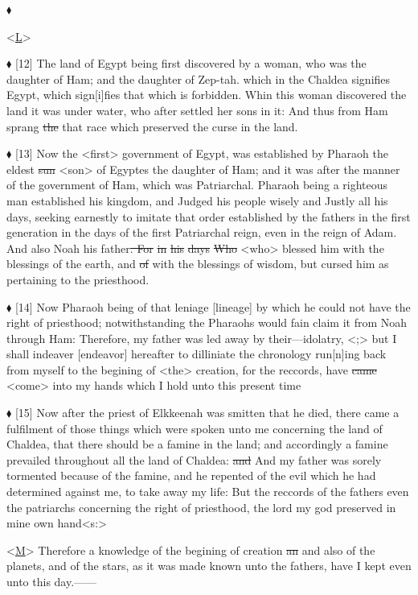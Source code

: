 				\begin{tightright}
				$\blacklozenge$

				<\uline{L}>
				\end{tightright}

				$\blacklozenge$ [12]	The land of Egypt being first discovered by a woman, who was the daughter of Ham; and the daughter of Zep-tah. which in the Chaldea signifies Egypt, which sign[i]fies that which is forbidden. Whin this woman discovered the land it was under water, who after settled her sons in it: And thus from Ham sprang \sout{the} that race which preserved the curse in the land.

				$\blacklozenge$ [13]	Now the <first> government of Egypt, was established by Pharaoh the eldest \sout{sun} <son> of Egyptes the daughter of Ham; and it was after the manner of the government of Ham, which was Patriarchal. Pharaoh being a righteous man established his kingdom, and Judged his people wisely and Justly all his days, seeking earnestly to imitate that order established by the fathers in the first generation in the days of the first Patriarchal reign, even in the reign of Adam. And also Noah his father\sout{. For} \sout{in} \sout{his} \sout{days} \sout{Who} <who> blessed him with the blessings of the earth, and \sout{of} with the blessings of wisdom, but cursed him as pertaining to the priesthood.

				$\blacklozenge$ [14]	Now Pharaoh being of that leniage [lineage] by which he could not have the right of priesthood; notwithstanding the Pharaohs would fain claim it from Noah through Ham: Therefore, my father was led away by their---idolatry, <;> but I shall indeaver [endeavor] hereafter to dilliniate the chronology run[n]ing back from myself to the begining of <the> creation, for the reccords, have \sout{came} <come> into my hands which I hold unto this present time

				$\blacklozenge$ [15]	Now after the priest of Elkkeenah was smitten that he died, there came a fulfilment of those things which were spoken unto me concerning the land of Chaldea, that there should be a famine in the land; and accordingly a famine prevailed throughout all the land of Chaldea: \sout{and} And my father was sorely tormented because of the famine, and he repented of the evil which he had determined against me, to take away my life: But the reccords of the fathers even the patriarchs concerning the right of priesthood, the lord my god preserved in mine own hand<s:>

				<\uline{M}> Therefore a knowledge of the begining of creation \sout{an} and also of the planets, and of the stars, as it was made known unto the fathers, have I kept even unto this day.------


